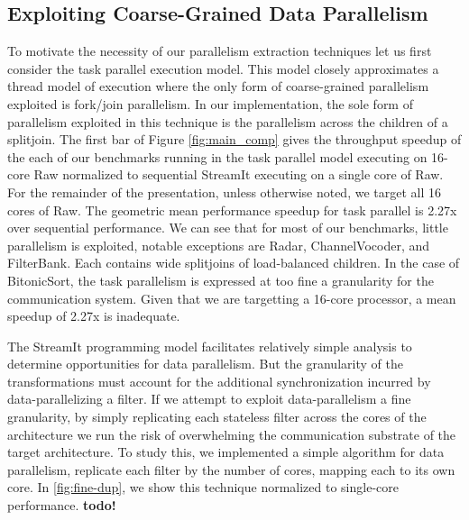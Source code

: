 \subsection{Exploiting Coarse-Grained Data Parallelism}
To motivate the necessity of our parallelism extraction techniques let
us first consider the task parallel execution model.  This model
closely approximates a thread model of execution where the only form
of coarse-grained parallelism exploited is fork/join parallelism.  In
our implementation, the sole form of parallelism exploited in this
technique is the parallelism across the children of a splitjoin. The
first bar of Figure \ref{fig:main_comp} gives the throughput speedup
of the each of our benchmarks running in the task parallel model
executing on 16-core Raw normalized to sequential StreamIt executing
on a single core of Raw.  For the remainder of the presentation,
unless otherwise noted, we target all 16 cores of Raw.  The geometric
mean performance speedup for task parallel is 2.27x over sequential
performance. We can see that for most of our benchmarks, little
parallelism is exploited, notable exceptions are Radar,
ChannelVocoder, and FilterBank.  Each contains wide splitjoins of
load-balanced children.  In the case of BitonicSort, the task
parallelism is expressed at too fine a granularity for the
communication system.  Given that we are targetting a 16-core
processor, a mean speedup of 2.27x is inadequate.

The StreamIt programming model facilitates relatively simple analysis
to determine opportunities for data parallelism.  But the granularity
of the transformations must account for the additional synchronization
incurred by data-parallelizing a filter.  If we attempt to exploit
data-parallelism a fine granularity, by simply replicating each
stateless filter across the cores of the architecture we run the risk
of overwhelming the communication substrate of the target
architecture.  To study this, we implemented a simple algorithm for
data parallelism, replicate each filter by the number of cores,
mapping each to its own core.  In
\ref{fig:fine-dup}, we show this technique normalized to single-core
performance.  \textbf{todo!}


